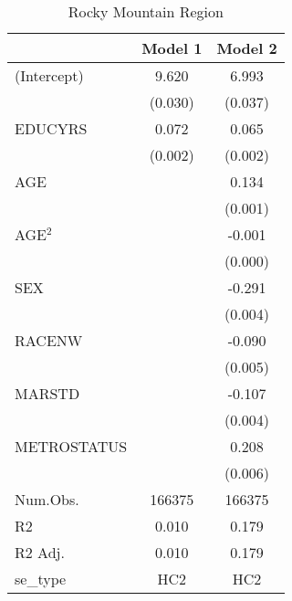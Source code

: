 \documentclass[12pt, English]{article}
\begin{document}
\begin{table}
\centering %
    \caption{Rocky Mountain Region}
    \vspace{7.5mm} %
\begin{tabular}[t]{lcc}
\toprule
 & Model 1 & Model 2\\
\midrule
(Intercept) & 9.620 & 6.993\\
 & (0.030) & (0.037)\\
EDUCYRS & 0.072 & 0.065\\
 & (0.002) & (0.002)\\
AGE &  & 0.134\\
 &  & (0.001)\\
AGE$^2$ &  & -0.001\\
 &  & (0.000)\\
SEX &  & -0.291\\
 &  & \vphantom{1} (0.004)\\
RACENW &  & -0.090\\
 &  & (0.005)\\
MARSTD &  & -0.107\\
 &  & (0.004)\\
METROSTATUS &  & 0.208\\
 &  & (0.006)\\
\midrule
Num.Obs. & 166375 & 166375\\
R2 & 0.010 & 0.179\\
R2 Adj. & 0.010 & 0.179\\
se\_type & HC2 & HC2\\
\bottomrule
\end{tabular}
\end{table}



\newpage
\end{document}
